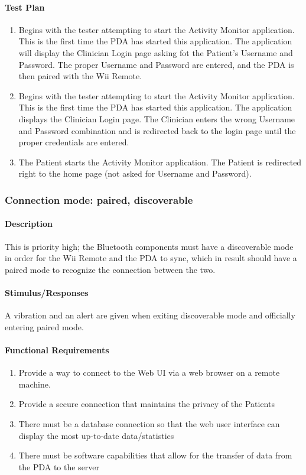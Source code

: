 \documentclass{article}
\begin{document}
\paragraph {Test Plan}
\begin{enumerate}
\item Begins with the tester attempting to start the Activity Monitor application. This is the first time the PDA has started this application. The application will display the Clinician Login page asking fot the Patient's Username and Password. The proper Username and Password are entered, and the PDA is then paired with the Wii Remote.
\item Begins with the tester attempting to start the Activity Monitor application. This is the first time the PDA has started this application. The application displays the Clinician Login page. The Clinician enters the wrong Username and Password combination and is redirected back to the login page until the proper credentials are entered. 
\item The Patient starts the Activity Monitor application. The Patient is redirected right to the home page (not asked for Username and Password).
\end{enumerate}


\subsubsection {Connection mode: paired, discoverable}\label{sec: Conn Mode}
\paragraph {Description}
This is priority high; the Bluetooth components must have a discoverable mode in order for the Wii Remote and the PDA to sync, which in result should have a paired mode to recognize the connection between the two.

\paragraph {Stimulus/Responses}
A vibration and an alert are given when exiting discoverable mode and officially entering paired mode.

\paragraph {Functional Requirements}
\begin{enumerate}
\item Provide a way to connect to the Web UI via a web browser on a remote machine.
\item Provide a secure connection that maintains the privacy of the Patients 	 
\item There must be a database connection so that the web user interface can display the most up-to-date data/statistics	
\item There must be software capabilities that allow for the transfer of data from the PDA to the server
\end{enumerate}
\end{document}
